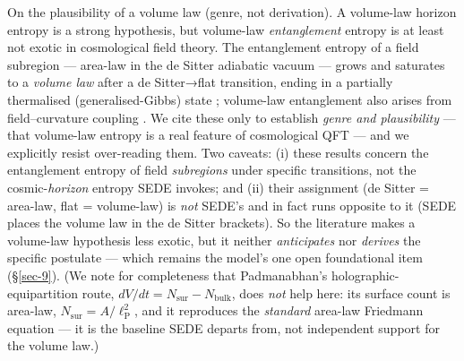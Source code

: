\documentclass[preprint,12pt]{elsarticle}
\begin{document}
On the plausibility of a volume law (genre, not derivation). A
volume-law horizon entropy is a strong hypothesis, but volume-law
\emph{entanglement} entropy is at least not exotic in cosmological field
theory. The entanglement entropy of a field subregion --- area-law in
the de Sitter adiabatic vacuum --- grows and saturates to a \emph{volume
law} after a de Sitter→flat transition, ending in a partially
thermalised (generalised-Gibbs) state \citep{Khlebnikov:2019wbk};
volume-law entanglement also arises from field--curvature coupling
\citep{Belfiglio:2023sru}. We cite these only to establish \emph{genre
and plausibility} --- that volume-law entropy is a real feature of
cosmological QFT --- and we explicitly resist over-reading them. Two
caveats: (i) these results concern the entanglement entropy of field
\emph{subregions} under specific transitions, not the
cosmic-\emph{horizon} entropy SEDE invokes; and (ii) their assignment
(de Sitter = area-law, flat = volume-law) is \emph{not} SEDE's and in
fact runs opposite to it (SEDE places the volume law in the de Sitter
brackets). So the literature makes a volume-law hypothesis less exotic,
but it neither \emph{anticipates} nor \emph{derives} the specific
postulate --- which remains the model's one open foundational item
(§\ref{sec-9}). (We note for completeness that Padmanabhan's
holographic-equipartition route,
\(dV/dt = N_{\mathrm{sur}} - N_{\mathrm{bulk}}\), does \emph{not} help
here: its surface count is area-law,
\(N_{\mathrm{sur}} = A/\ell _{\mathrm{P}}^{2}\), and it reproduces the
\emph{standard} area-law Friedmann equation --- it is the baseline SEDE
departs from, not independent support for the volume law.)
\end{document}
